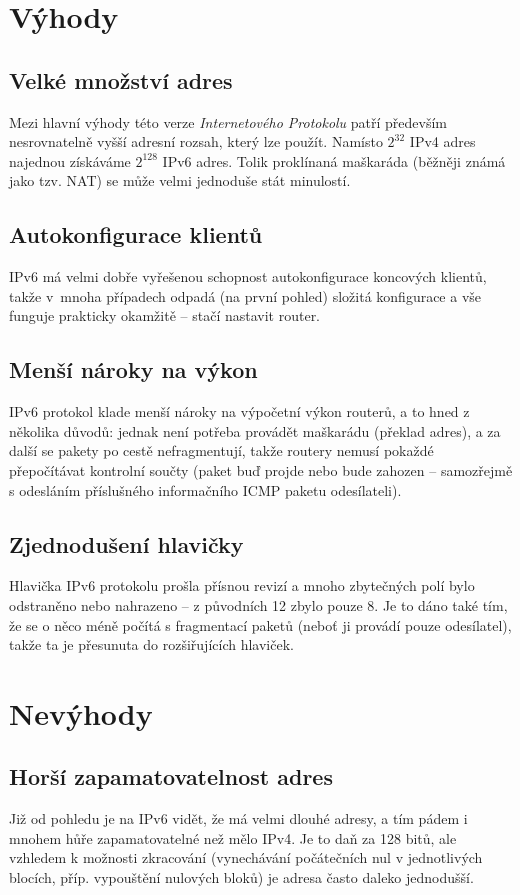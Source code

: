 \documentclass[12pt]{report}
\begin{document}
\section{Výhody}
\subsection{Velké množství adres}
Mezi hlavní výhody této verze \textit{Internetového Protokolu} patří především nesrovnatelně vyšší adresní rozsah, který lze použít. Namísto $2^{32}$ IPv4 adres najednou získáváme $2^{128}$ IPv6 adres. Tolik proklínaná maškaráda (běžněji známá jako tzv. NAT) se může velmi jednoduše stát minulostí.

\subsection{Autokonfigurace klientů}
IPv6 má velmi dobře vyřešenou schopnost autokonfigurace koncových klientů, takže v~mnoha případech odpadá (na první pohled) složitá konfigurace a vše funguje prakticky okamžitě -- stačí nastavit router.

\subsection{Menší nároky na výkon}
IPv6 protokol klade menší nároky na výpočetní výkon routerů, a to hned z několika důvodů: jednak není potřeba provádět maškarádu (překlad adres), a za další se pakety po cestě nefragmentují, takže routery nemusí pokaždé přepočítávat kontrolní součty (paket buď projde nebo bude zahozen -- samozřejmě s odesláním příslušného informačního ICMP paketu odesílateli).

\subsection{Zjednodušení hlavičky}
Hlavička IPv6 protokolu prošla přísnou revizí a mnoho zbytečných polí bylo odstraněno nebo nahrazeno -- z původních 12 zbylo pouze 8. Je to dáno také tím, že se o něco méně počítá s fragmentací paketů (neboť ji provádí pouze odesílatel), takže ta je přesunuta do rozšiřujících hlaviček.

\section{Nevýhody}
\subsection{Horší zapamatovatelnost adres}
Již od pohledu je na IPv6 vidět, že má velmi dlouhé adresy, a tím pádem i mnohem hůře zapamatovatelné než mělo IPv4. Je to daň za 128 bitů, ale vzhledem k možnosti zkracování (vynechávání počátečních nul v jednotlivých blocích, příp. vypouštění nulových bloků) je adresa často daleko jednodušší.
\end{document}
